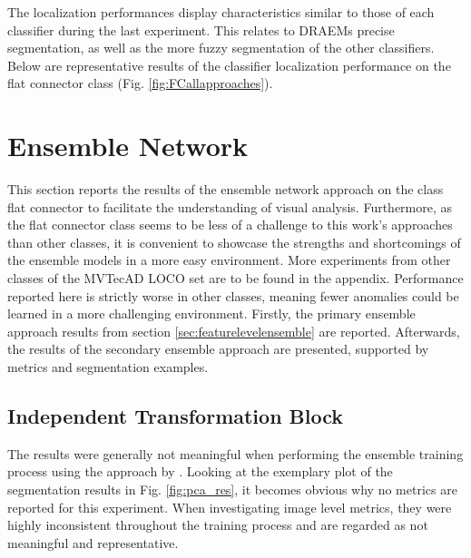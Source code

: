 The localization performances display characteristics similar to those of each classifier during the last experiment. This relates to DRAEMs \cite{Zavrtanik_2021DRAEM} precise segmentation, 
as well as the more fuzzy segmentation of the other classifiers. Below are representative results of the classifier localization performance on the flat connector class (Fig. \ref{fig:FCallapproaches}).






\section{Ensemble Network}
\label{sec:ensembleresults}

This section reports the results of the ensemble network approach on the class flat connector to facilitate the understanding of visual 
analysis. Furthermore, as the flat connector class seems to be less of a challenge to this work's approaches than other classes, it is convenient to showcase the strengths and 
shortcomings of the ensemble models in a more easy environment. More experiments from other classes of the MVTecAD LOCO \cite{LOCODentsAndScratchesBergmann2022} set are to be found in the appendix. 
Performance reported here is strictly worse in other classes, meaning fewer anomalies could be learned in a more challenging environment. Firstly, the primary ensemble approach results from section \ref{sec:featurelevelensemble} are reported. Afterwards, 
the results of the secondary ensemble approach are presented, supported by metrics and segmentation examples.


\subsection{Independent Transformation Block}
\label{subsec:ITBfail}

The results were generally not meaningful when performing the ensemble training process using the approach by \cite{EnsembleHeller2023}. Looking at the exemplary plot of the segmentation 
results in Fig. \ref{fig:pca_res}, it becomes obvious why no metrics are reported for this experiment. When investigating image level metrics, they were highly inconsistent throughout 
the training process and are regarded as not meaningful and representative.



